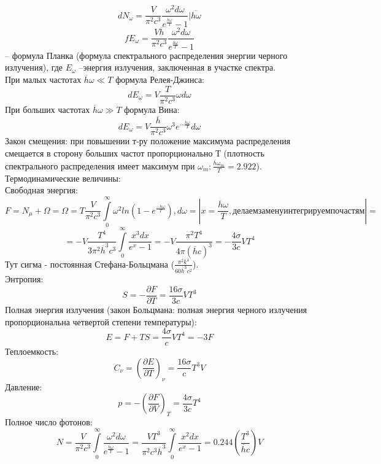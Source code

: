 $$dN_{\omega} = \frac{V}{\pi^2c^3} \frac{\omega^2d\omega}{e^{\frac{\overline{h}\omega}{T}}-1} | \overline{h \omega}$$
$$fE_{\omega} = \frac{V\overline{h}}{\pi^2c^3} \frac{\omega^2d\omega}{e^{\frac{\overline{h}\omega}{T}}-1}$$ -- формула Планка (формула спектрального распределения энергии черного излучения), где $E_{\omega}$ --энергия излучения, заключенная в участке спектра.
\\
При малых частотах $\overline{h}\omega \ll T $ формула Релея-Джинса:
$$dE_{\omega} = V\frac{T}{\pi^2c^3}\omega d\omega$$
При больших частотах $\overline{h}\omega \gg T $ формула Вина:
$$dE_{\omega} = V\frac{\overline{h}}{\pi^2c^3}\omega^3 e^{-\frac{\overline{h}\omega}{T}} d\omega$$
Закон смещения: при повышении т-ру положение максимума распределения смещается в сторону больших частот пропорционально Т (плотность спектрального распределения имеет максимум при $\omega_m: \frac{\overline{h}\omega_m}{T} = 2.922$).
\\
Термодинамические величины:
\\
Свободная энергия:
$$
F = N_{\mu} + \Omega = \Omega = T \frac{V}{\pi^2c^3} \int\limits_{0}^{\infty} \omega^2 ln(1- e^{\frac{-\overline{h}\omega}{T}}), d\omega = |x = \frac{\overline{h}\omega}{T}, делаем замену интегрируем по частям| =
$$ 
$$
= -V \frac{T^4}{3\pi^2\overline{h}^3 c^3} \int\limits_{0}^{\infty}\frac{x^3dx}{e^x-1} = - V\frac{\pi^2T^4}{4\pi(\overline{h}c)^3} = -\frac{4\sigma}{3c}VT^4
$$
Тут сигма - постоянная Стефана-Больцмана ($\frac{\pi^2k^4}{60\overline{h}^3c^2}$).
\\
Энтропия:
$$S = -\frac{\partial F}{\partial T} = \frac{16\sigma}{3c}VT^3$$
Полная энергия излучения (закон Больцмана: полная энергия черного излучения пропорциональна четвертой степени температуры):
$$E = F + TS = \frac{4\sigma}{c}VT^4 = -3F$$
Теплоемкость: 
$$C_{\nu} = (\frac{\partial E}{\partial T})_{\nu} = \frac{16\sigma}{c}T^3V$$
Давление:
$$p = - (\frac{\partial F}{\partial V})_T = \frac{4\sigma}{3c}T^4$$
Полное число фотонов:
$$N = \frac{V}{\pi^2c^3} \int\limits_{0}^{\infty} \frac{\omega^2d\omega}{e^{\frac{\overline{h}\omega}{T}}-1} = \frac{VT^3}{\pi^2c^3\overline{h}^3} \int\limits_{0}^{\infty} \frac {x^2dx}{e^x - 1} = 0.244(\frac{T^3}{\overline{h}c})V$$

